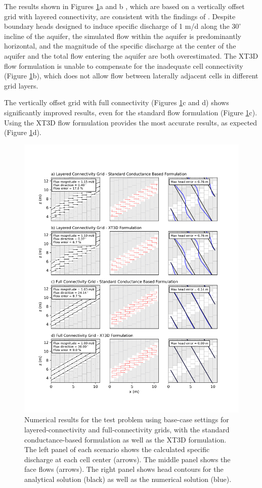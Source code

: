 \documentclass{article}
\begin{document}
The results shown in Figures \ref{fig:fig2}a and b , which are based on a vertically offset grid with layered connectivity, are consistent with the findings of \cite{bardot2022}. Despite boundary heads designed to induce specific discharge of 1 m/d along the $30^{\circ}$ incline of the aquifer, the simulated flow within the aquifer is predominantly horizontal, and the magnitude of the specific discharge at the center of the aquifer and the total flow entering the aquifer are both overestimated. The XT3D flow formulation is unable to compensate for the inadequate cell connectivity (Figure \ref{fig:fig2}b), which does not allow flow between laterally adjacent cells in different grid layers.

The vertically offset grid with full connectivity (Figures \ref{fig:fig2}c and d) shows significantly improved results, even for the standard flow formulation (Figure \ref{fig:fig2}c). Using the XT3D flow formulation provides the most accurate results, as expected (Figure \ref{fig:fig2}d).

\begin{figure}[p!]
	\begin{center}
	\includegraphics[scale=0.8]{../figures/fig2_paper.png}
	\caption{Numerical results for the test problem using base-case settings for layered-connectivity and full-connectivity grids, with the standard conductance-based formulation as well as the XT3D formulation. The left panel of each scenario shows the calculated specific discharge at each cell center (arrows). The middle panel shows the face flows (arrows). The right panel shows head contours for the analytical solution (black) as well as the numerical solution (blue).}
	\label{fig:fig2}
	\end{center}
\end{figure}
\end{document}
